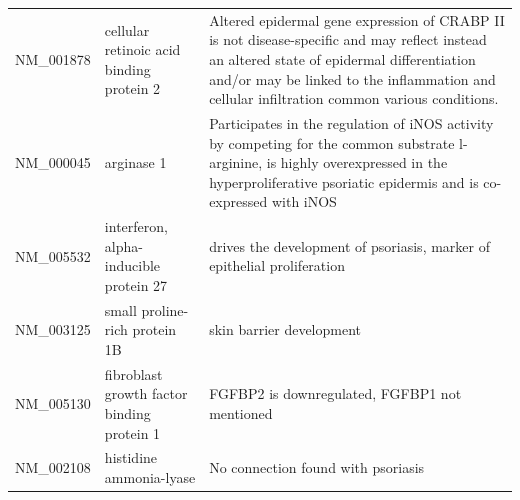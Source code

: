\documentclass[10pt,a4paper]{article}
\begin{document}
\begin{table}[]
\begin{tabular}{l|p{4.5cm} p{8.5cm}}
		NM\_001878         & cellular retinoic acid binding protein 2                                                                                & Altered epidermal gene expression of CRABP II is not disease-specific and may reflect instead an altered state of epidermal differentiation and/or may be linked to the inflammation and cellular infiltration common various conditions.\cite{algermissen1996differential} \\
		NM\_000045         & arginase 1                                                                                                              & Participates in the regulation of iNOS activity by competing for the common substrate l-arginine, is highly overexpressed in the hyperproliferative psoriatic epidermis and is co-expressed with iNOS\cite{bruch2003arginase}                                     \\
		NM\_005532         & interferon, alpha-inducible protein 27                                                                                  & drives the development of psoriasis, marker of epithelial proliferation\cite{nestle2005plasmacytoid, suomela2004interferon}                                                                                                                                                                     \\
		NM\_003125         & small proline-rich protein 1B                                                                                           & skin barrier development\cite{bergboer2012genetics}                                                                                                                                                                                                                    \\
		NM\_005130         & fibroblast growth factor binding protein 1                                                                              & FGFBP2 is downregulated, FGFBP1 not mentioned\cite{suarez2012expanding}                                                                                                                                                                                               \\
		NM\_002108         & histidine ammonia-lyase                                                                                                 & No connection found with psoriasis                                                                                                                                                                                                                                          \\ \hline                                                                                                                                                                                                                                        
	\end{tabular}
\end{table}
	
\end{document}
